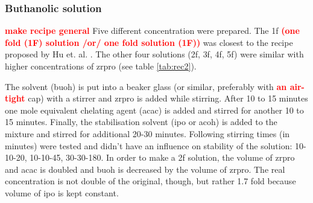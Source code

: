 \documentclass[a4paper]{article}
\newcommand{\td}[1]{\textbf{\textcolor{red}{#1}}}
\newcommand{\ds}[1]{}
\begin{document}
\subsubsection{Buthanolic solution}
\label{sec:sol}
\td{make recipe general}
Five different concentration were prepared. 
The \gls{1f} \td{(one fold (1F) solution /or/ one fold solution (1F))}
was closest to the recipe proposed by Hu et. al. \cite{Hu2016}. 
The other four solutions (\gls{2f}, \gls{3f}, \gls{4f}, \gls{5f}) were similar with higher concentrations of \gls{zrpro} (see table \ref{tab:rec2}).

The solvent (\gls{buoh}) is put into a beaker glass (or similar, preferably with \td{an air-tight} cap) with a stirrer and \gls{zrpro} is added while stirring.  
After 10 to 15 minutes one mole equivalent chelating agent (\gls{acac}) is added and stirred for another 10 to 15 minutes. 
Finally, the stabilisation solvent (\gls{ipo} or \gls{acoh}) is added to the mixture and stirred for additional 20-30 minutes. 
Following stirring times (in minutes) were tested and didn't have an influence on stability of the solution: 10-10-20, 10-10-45, 30-30-180. 
In order to make a \gls{2f} solution, the volume of \gls{zrpro} and \gls{acac} is doubled and \gls{buoh} is decreased by the volume of \gls{zrpro}. 
The real concentration is not double of the original, though, but rather 1.7 fold because volume of \gls{ipo} is kept constant.
\end{document}
